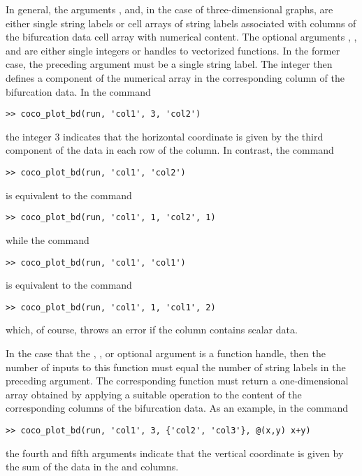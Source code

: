 In general, the arguments ,  and, in the case of three-dimensional graphs,  are either single string labels or cell arrays of string labels associated with columns of the bifurcation data cell array with numerical content. The optional arguments , , and  are either single integers or handles to vectorized functions. In the former case, the preceding argument must be a single string label. The integer then defines a component of the numerical array in the corresponding column of the bifurcation data. In the command
\begin{lstlisting}[language=coco-highlight]
>> coco_plot_bd(run, 'col1', 3, 'col2')
\end{lstlisting}
the integer $3$ indicates that the horizontal coordinate is given by the third component of the data in each row of the  column. In contrast, the command
\begin{lstlisting}[language=coco-highlight]
>> coco_plot_bd(run, 'col1', 'col2')
\end{lstlisting}
is equivalent to the command
\begin{lstlisting}[language=coco-highlight]
>> coco_plot_bd(run, 'col1', 1, 'col2', 1)
\end{lstlisting}
while the command
\begin{lstlisting}[language=coco-highlight]
>> coco_plot_bd(run, 'col1', 'col1')
\end{lstlisting}
is equivalent to the command
\begin{lstlisting}[language=coco-highlight]
>> coco_plot_bd(run, 'col1', 1, 'col1', 2)
\end{lstlisting}
which, of course, throws an error if the  column contains scalar data.

In the case that the , , or  optional argument is a function handle, then the number of inputs to this function must equal the number of string labels in the preceding argument. The corresponding function must return a one-dimensional array obtained by applying a suitable operation to the content of the corresponding columns of the bifurcation data. As an example, in the command
\begin{lstlisting}[language=coco-highlight]
>> coco_plot_bd(run, 'col1', 3, {'col2', 'col3'}, @(x,y) x+y)
\end{lstlisting}
the fourth and fifth arguments indicate that the vertical coordinate is given by the sum of the data in the  and  columns.

